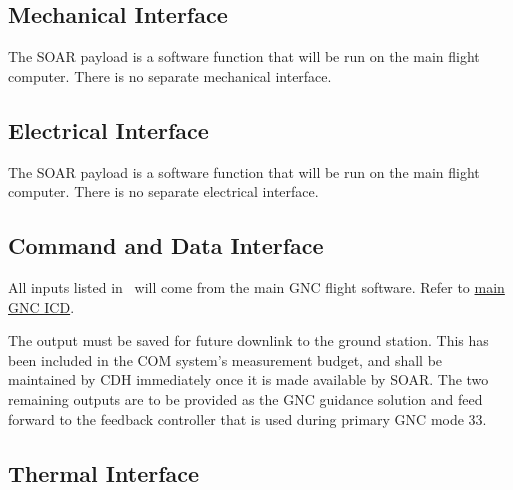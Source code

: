 \documentclass[10pt]{article}
\begin{document}

\subsection{Mechanical Interface}\label{sec2:mech_interface}

The SOAR payload is a software function that will be run on the main flight computer. There is no separate mechanical interface.

\subsection{Electrical Interface}\label{sec2:elec_interface}

The SOAR payload is a software function that will be run on the main flight computer. There is no separate electrical interface.

\subsection{Command and Data Interface}\label{sec2:cmd_interface}

All inputs listed in~ will come from the main GNC flight software. Refer to \href{https://drive.google.com/open?id=1wTjmsQdXGk9jmEHy59fZAdBJJ3r1IE4LGFjHT2S5png}{main GNC ICD}.

The output  must be saved for future downlink to the ground station. This has been included in the COM system's measurement budget, and shall be maintained by CDH immediately once it is made available by SOAR. The two remaining outputs are to be provided as the GNC guidance solution and feed forward to the feedback controller that is used during primary GNC mode $33$. 

\subsection{Thermal Interface}\label{sec2:thermal_interface}
\end{document}
